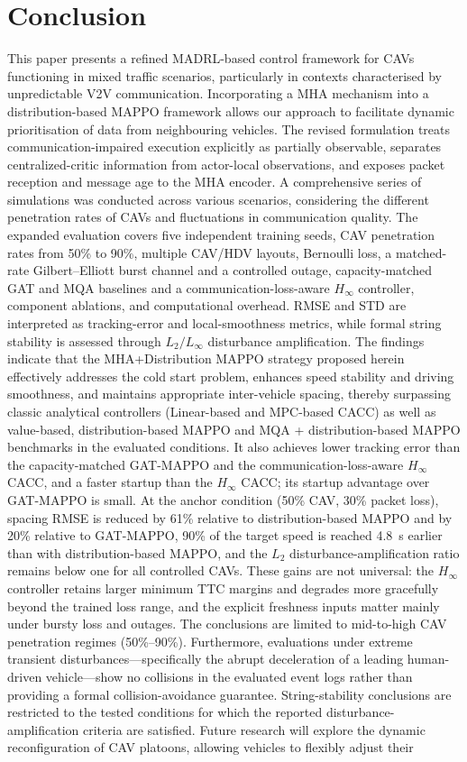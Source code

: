 \documentclass{ieeeaccess}
\begin{document}
\section{Conclusion}
\label{sec:Conclusion}
This paper presents a refined MADRL-based control framework for CAVs functioning in mixed traffic scenarios, particularly in contexts characterised by unpredictable V2V communication. Incorporating a MHA mechanism into a distribution-based MAPPO framework allows our approach to facilitate dynamic prioritisation of data from neighbouring vehicles. The revised formulation treats communication-impaired execution explicitly as partially observable, separates centralized-critic information from actor-local observations, and exposes packet reception and message age to the MHA encoder. A comprehensive series of simulations was conducted across various scenarios, considering the different penetration rates of CAVs and fluctuations in communication quality. The expanded evaluation covers five independent training seeds, CAV penetration rates from 50\% to 90\%, multiple CAV/HDV layouts, Bernoulli loss, a matched-rate Gilbert--Elliott burst channel and a controlled outage, capacity-matched GAT and MQA baselines and a communication-loss-aware $H_\infty$ controller, component ablations, and computational overhead. RMSE and STD are interpreted as tracking-error and local-smoothness metrics, while formal string stability is assessed through $L_2/L_\infty$ disturbance amplification. The findings indicate that the MHA+Distribution MAPPO strategy proposed herein effectively addresses the cold start problem, enhances speed stability and driving smoothness, and maintains appropriate inter-vehicle spacing, thereby surpassing classic analytical controllers (Linear-based and MPC-based CACC) as well as value-based, distribution-based MAPPO and MQA + distribution-based MAPPO benchmarks in the evaluated conditions. It also achieves lower tracking error than the capacity-matched GAT-MAPPO and the communication-loss-aware $H_\infty$ CACC, and a faster startup than the $H_\infty$ CACC; its startup advantage over GAT-MAPPO is small. At the anchor condition (50\% CAV, 30\% packet loss), spacing RMSE is reduced by 61\% relative to distribution-based MAPPO and by 20\% relative to GAT-MAPPO, 90\% of the target speed is reached 4.8~s earlier than with distribution-based MAPPO, and the $L_2$ disturbance-amplification ratio remains below one for all controlled CAVs. These gains are not universal: the $H_\infty$ controller retains larger minimum TTC margins and degrades more gracefully beyond the trained loss range, and the explicit freshness inputs matter mainly under bursty loss and outages. The conclusions are limited to mid-to-high CAV penetration regimes (50\%--90\%). Furthermore, evaluations under extreme transient disturbances—specifically the abrupt deceleration of a leading human-driven vehicle—show no collisions in the evaluated event logs rather than providing a formal collision-avoidance guarantee. String-stability conclusions are restricted to the tested conditions for which the reported disturbance-amplification criteria are satisfied. Future research will explore the dynamic reconfiguration of CAV platoons, allowing vehicles to flexibly adjust their 
\end{document}
